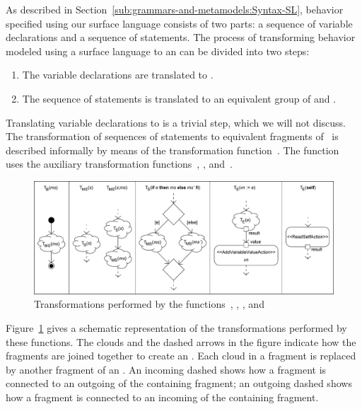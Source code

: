 As described in Section~\ref{sub:grammars-and-metamodels:Syntax-SL}, behavior specified using our surface language consists of two parts: a sequence of variable declarations and a sequence of statements.
The process of transforming behavior modeled using a surface language to an \Activity can be divided into two steps:
\begin{enumerate}
\item The variable declarations are translated to \UML \Variables.
\item The sequence of statements is translated to an equivalent group of \ActivityNodes and \ActivityEdges.
\end{enumerate}
Translating variable declarations to \UML \Variables is a trivial step, which we will not discuss.
The transformation of sequences of statements to equivalent fragments of \UML~\Activities is described informally by means of the transformation function~.
The function~ uses the auxiliary transformation functions~, , and~.

\begin{figure}
\centering
\includegraphics[scale=0.44]{grammars-and-metamodels/figs/transformation}
\caption{Transformations performed by the functions~, , , and~}
\label{fig:grammars-and-metamodels:trans-schematic}
\end{figure}

Figure~\ref{fig:grammars-and-metamodels:trans-schematic} gives a schematic representation of the transformations performed by these functions.
The clouds and the dashed arrows in the figure indicate how the fragments are joined together to create an \Activity.
Each cloud in a fragment is replaced by another fragment of an \Activity.
An incoming dashed \ActivityEdge shows how a fragment is connected to an outgoing \ActivityEdge of the containing fragment; an outgoing dashed \ActivityEdge shows how a fragment is connected to an incoming \ActivityEdge of the containing fragment.

